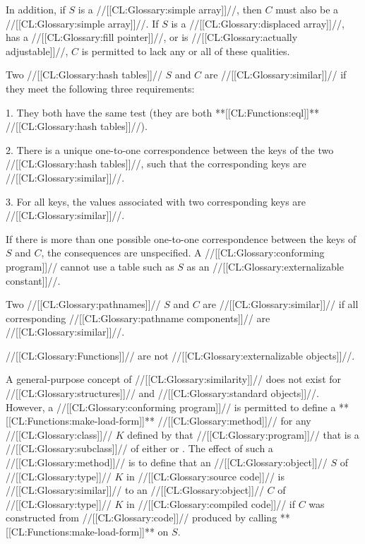 In addition,
if $S$ is a //[[CL:Glossary:simple array]]//, then $C$ must also be a //[[CL:Glossary:simple array]]//.
If $S$ is a //[[CL:Glossary:displaced array]]//,
       has a //[[CL:Glossary:fill pointer]]//,
    or is //[[CL:Glossary:actually adjustable]]//, 
$C$ is permitted to lack any or all of these qualities.


Two //[[CL:Glossary:hash tables]]// $S$ and $C$ are //[[CL:Glossary:similar]]// if they meet the following
three requirements:
 
\beginlist
\item{1.}  They both have the same test 
 	    (\eg they are both **[[CL:Functions:eql]]** //[[CL:Glossary:hash tables]]//).
 
\item{2.}  There is a unique one-to-one correspondence between the keys of
           the two //[[CL:Glossary:hash tables]]//, such that the corresponding keys are 
	   //[[CL:Glossary:similar]]//.

\item{3.}  For all keys, the values associated with two corresponding keys
           are //[[CL:Glossary:similar]]//.
\endlist
 
If there is more than one possible one-to-one correspondence between
the keys of $S$ and $C$, the consequences are unspecified.  
A //[[CL:Glossary:conforming program]]// cannot use a table such as $S$ as an
//[[CL:Glossary:externalizable constant]]//.
 
 
Two //[[CL:Glossary:pathnames]]// $S$ and $C$ are //[[CL:Glossary:similar]]// if all corresponding 
//[[CL:Glossary:pathname components]]// are //[[CL:Glossary:similar]]//.

 
//[[CL:Glossary:Functions]]// are not //[[CL:Glossary:externalizable objects]]//.



A general-purpose concept of //[[CL:Glossary:similarity]]// does not exist for //[[CL:Glossary:structures]]//
and //[[CL:Glossary:standard objects]]//.
However, a //[[CL:Glossary:conforming program]]// is permitted to define a **[[CL:Functions:make-load-form]]**
//[[CL:Glossary:method]]// for any //[[CL:Glossary:class]]// $K$ defined by that //[[CL:Glossary:program]]// that is
a //[[CL:Glossary:subclass]]// of either  or .
The effect of such a //[[CL:Glossary:method]]// is to define that an //[[CL:Glossary:object]]// $S$ of //[[CL:Glossary:type]]// $K$
in //[[CL:Glossary:source code]]// is //[[CL:Glossary:similar]]// to an //[[CL:Glossary:object]]// $C$ of //[[CL:Glossary:type]]// $K$
in //[[CL:Glossary:compiled code]]// if $C$ was constructed from //[[CL:Glossary:code]]// produced by 
calling **[[CL:Functions:make-load-form]]** on $S$.


